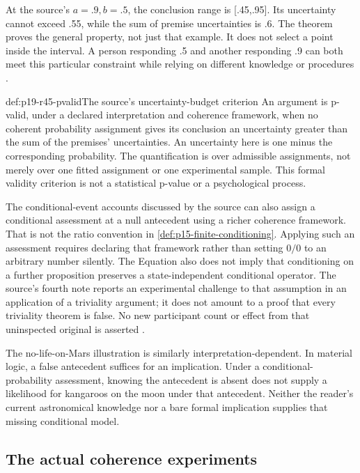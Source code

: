 At the source's \(a=.9,b=.5\), the conclusion range is [.45,.95].
Its uncertainty cannot exceed .55, while the sum of premise
uncertainties is .6. The theorem proves the general property, not just
that example. It does not select a point inside the interval. A person
responding .5 and another responding .9 can both meet this particular
constraint while relying on different knowledge or procedures
\cite[pp.~286--287, note~3]{ChaterOaksford2021BayesianReasoning}.

\begin{hbdefinition}{def:p19-r45-pvalid}{The source's uncertainty-budget criterion}
An argument is p-valid, under a declared interpretation and coherence
framework, when no coherent probability assignment gives its conclusion
an uncertainty greater than the sum of the premises' uncertainties.
An uncertainty here is one minus the corresponding probability.
The quantification is over admissible assignments, not merely over one
fitted assignment or one experimental sample. This formal validity
criterion is not a statistical p-value or a psychological process.
\end{hbdefinition}

The conditional-event accounts discussed by the source can also assign
a conditional assessment at a null antecedent using a richer coherence
framework. That is not the ratio convention in
\cref{def:p15-finite-conditioning}. Applying such an assessment requires
declaring that framework rather than setting \(0/0\) to an arbitrary
number silently. The Equation also does not imply that conditioning
on a further proposition preserves a state-independent conditional
operator. The source's fourth note reports an experimental challenge
to that assumption in an application of a triviality argument; it does
not amount to a proof that every triviality theorem is false. No new
participant count or effect from that uninspected original is asserted
\cite[pp.~286,292, note~4]{ChaterOaksford2021BayesianReasoning}.

The no-life-on-Mars illustration is similarly interpretation-dependent.
In material logic, a false antecedent suffices for an implication.
Under a conditional-probability assessment, knowing the antecedent is
absent does not supply a likelihood for kangaroos on the moon under
that antecedent. Neither the reader's current astronomical knowledge
nor a bare formal implication supplies that missing conditional model.

\subsection{The actual coherence experiments}
\label{sec:p19-r45-coherence-studies}

